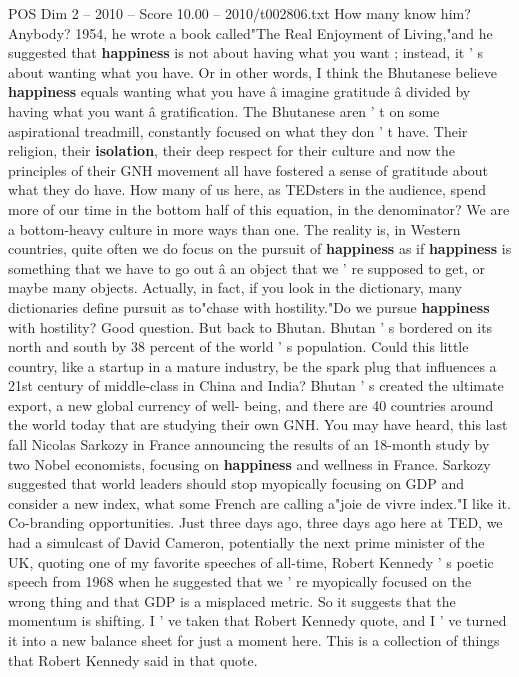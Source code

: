 \begin{textsample}{POS Dim 2 – 2010 – Score 10.00 – 2010/t002806.txt}
How many know him?
Anybody? 1954, he wrote a book called"The Real Enjoyment of Living,"and he suggested that \textbf{happiness} is not about having what you want ; instead, it ' s about wanting what you have.
Or in other words, I think the Bhutanese believe \textbf{happiness} equals wanting what you have â imagine gratitude â divided by having what you want â gratification.
The Bhutanese aren ' t on some aspirational treadmill, constantly focused on what they don ' t have.
Their religion, their \textbf{isolation}, their deep respect for their culture and now the principles of their GNH movement all have fostered a sense of gratitude about what they do have.
How many of us here, as TEDsters in the audience, spend more of our time in the bottom half of this equation, in the denominator?
We are a bottom-heavy culture in more ways than one.
The reality is, in Western countries, quite often we do focus on the pursuit of \textbf{happiness} as if \textbf{happiness} is something that we have to go out â an object that we ' re supposed to get, or maybe many objects.
Actually, in fact, if you look in the dictionary, many dictionaries define pursuit as to"chase with hostility."Do we pursue \textbf{happiness} with hostility?
Good question.
But back to Bhutan.
Bhutan ' s bordered on its north and south by 38 percent of the world ' s population.
Could this little country, like a startup in a mature industry, be the spark plug that influences a 21st century of middle-class in China and India?
Bhutan ' s created the ultimate export, a new global currency of well- being, and there are 40 countries around the world today that are studying their own GNH.
You may have heard, this last fall Nicolas Sarkozy in France announcing the results of an 18-month study by two Nobel economists, focusing on \textbf{happiness} and wellness in France.
Sarkozy suggested that world leaders should stop myopically focusing on GDP and consider a new index, what some French are calling a"joie de vivre index."I like it.
Co-branding opportunities.
Just three days ago, three days ago here at TED, we had a simulcast of David Cameron, potentially the next prime minister of the UK, quoting one of my favorite speeches of all-time, Robert Kennedy ' s poetic speech from 1968 when he suggested that we ' re myopically focused on the wrong thing and that GDP is a misplaced metric.
So it suggests that the momentum is shifting.
I ' ve taken that Robert Kennedy quote, and I ' ve turned it into a new balance sheet for just a moment here.
This is a collection of things that Robert Kennedy said in that quote.

\end{textsample}
